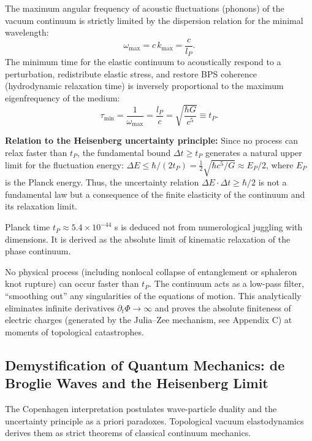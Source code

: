 \documentclass[11pt,a4paper]{article}
\begin{document}
The maximum angular frequency of acoustic fluctuations (phonons) of the vacuum continuum is strictly limited by the dispersion relation for the minimal wavelength:
\begin{equation}
\omega_{\text{max}} = c\, k_{\text{max}} = \frac{c}{l_P}.
\end{equation}
The minimum time for the elastic continuum to acoustically respond to a perturbation, redistribute elastic stress, and restore BPS coherence (hydrodynamic relaxation time) is inversely proportional to the maximum eigenfrequency of the medium:
\begin{equation}
\tau_{\text{min}} = \frac{1}{\omega_{\text{max}}} = \frac{l_P}{c} = \sqrt{\frac{\hbar G}{c^5}} \equiv t_P.
\end{equation}

\textbf{Relation to the Heisenberg uncertainty principle:}
Since no process can relax faster than $t_P$, the fundamental bound $\Delta t \ge t_P$ generates a natural upper limit for the fluctuation energy: $\Delta E \le \hbar / (2 t_P) = \frac12 \sqrt{\hbar c^5 / G} \approx E_P/2$, where $E_P$ is the Planck energy. Thus, the uncertainty relation $\Delta E \cdot \Delta t \ge \hbar/2$ is not a fundamental law but a consequence of the finite elasticity of the continuum and its relaxation limit.

Planck time $t_P \approx 5.4\times10^{-44}$ s is deduced not from numerological juggling with dimensions. It is derived as the absolute limit of kinematic relaxation of the phase continuum.

No physical process (including nonlocal collapse of entanglement or sphaleron knot rupture) can occur faster than $t_P$. The continuum acts as a low-pass filter, ``smoothing out'' any singularities of the equations of motion. This analytically eliminates infinite derivatives $\partial_t \Phi \to \infty$ and proves the absolute finiteness of electric charges (generated by the Julia–Zee mechanism, see Appendix C) at moments of topological catastrophes.

\subsection{Demystification of Quantum Mechanics: de Broglie Waves and the Heisenberg Limit}
The Copenhagen interpretation postulates wave-particle duality and the uncertainty principle as a priori paradoxes. Topological vacuum elastodynamics derives them as strict theorems of classical continuum mechanics.
\end{document}
